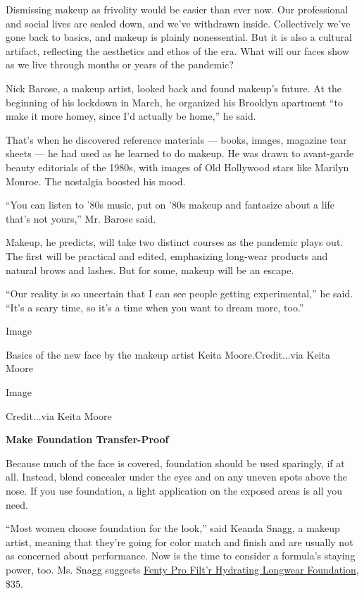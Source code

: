 Dismissing makeup as frivolity would be easier than ever now. Our
professional and social lives are scaled down, and we've withdrawn
inside. Collectively we've gone back to basics, and makeup is plainly
nonessential. But it is also a cultural artifact, reflecting the
aesthetics and ethos of the era. What will our faces show as we live
through months or years of the pandemic?

Nick Barose, a makeup artist, looked back and found makeup's future. At
the beginning of his lockdown in March, he organized his Brooklyn
apartment ``to make it more homey, since I'd actually be home,'' he
said.

That's when he discovered reference materials --- books, images,
magazine tear sheets --- he had used as he learned to do makeup. He was
drawn to avant-garde beauty editorials of the 1980s, with images of Old
Hollywood stars like Marilyn Monroe. The nostalgia boosted his mood.

``You can listen to '80s music, put on '80s makeup and fantasize about a
life that's not yours,'' Mr. Barose said.

Makeup, he predicts, will take two distinct courses as the pandemic
plays out. The first will be practical and edited, emphasizing long-wear
products and natural brows and lashes. But for some, makeup will be an
escape.

``Our reality is so uncertain that I can see people getting
experimental,'' he said. ``It's a scary time, so it's a time when you
want to dream more, too.''

Image

Basics of the new face by the makeup artist Keita Moore.Credit...via
Keita Moore

Image

Credit...via Keita Moore

\textbf{Make Foundation Transfer-Proof}

Because much of the face is covered, foundation should be used
sparingly, if at all. Instead, blend concealer under the eyes and on any
uneven spots above the nose. If you use foundation, a light application
on the exposed areas is all you need.

``Most women choose foundation for the look,'' said Keanda Snagg, a
makeup artist, meaning that they're going for color match and finish and
are usually not as concerned about performance. Now is the time to
consider a formula's staying power, too. Ms. Snagg suggests
\href{https://www.fentybeauty.com/pro-filtr-hydrating-longwear-foundation/FB30020.html}{Fenty
Pro Filt'r Hydrating Longwear Foundation}, \$35.


